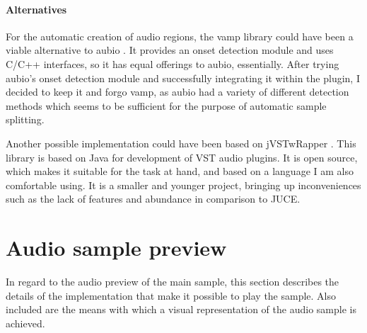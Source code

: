 \documentclass[12pt, a4paper, hidelinks]{report}
\begin{document}
	\paragraph{Alternatives\\}
	For the automatic creation of audio regions, the vamp \cite{vamp} library could have been a viable alternative to aubio \cite{aubio}. It provides an onset detection module \cite{vamponset} and uses C/C++ interfaces, so it has equal offerings to aubio, essentially. After trying aubio's onset detection module and successfully integrating it within the plugin, I decided to keep it and forgo vamp, as aubio had a variety of different detection methods which seems to be sufficient for the purpose of automatic sample splitting.\par 
	Another possible implementation could have been based on jVSTwRapper \cite{jVSTwRapper}. This library is based on Java for development of VST audio plugins. It is open source, which makes it suitable for the task at hand, and based on a language I am also comfortable using. It is a smaller and younger project, bringing up inconveniences such as the lack of features and abundance in comparison to JUCE. 
	
	
	\section{Audio sample preview}  
	In regard to the audio preview of the main sample, this section describes the details of the implementation that make it possible to play the sample. Also included are the means with which a visual representation of the audio sample is achieved.\par
	
\end{document}
